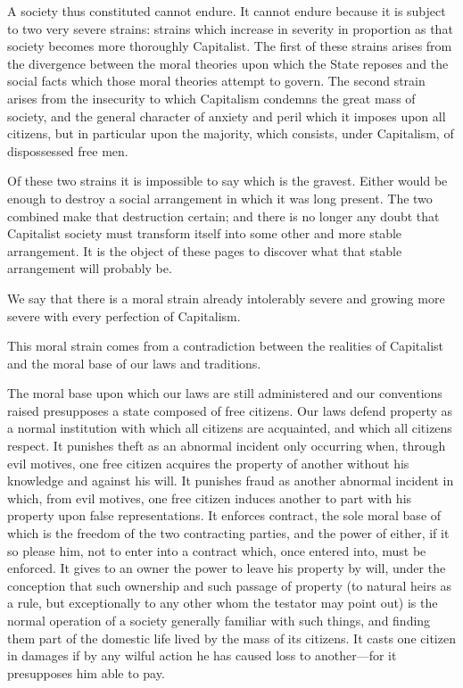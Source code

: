 \documentclass{book}
\begin{document}
A society thus constituted cannot endure. It cannot endure because it is subject to two very severe strains: strains which increase in severity in proportion as that society becomes more thoroughly Capitalist. The first of these strains arises from the divergence between the moral theories upon which the State reposes and the social facts which those moral theories attempt to govern. The second strain arises from the insecurity to which Capitalism condemns the great mass of society, and the general character of anxiety and peril which it imposes upon all citizens, but in particular upon the majority, which consists, under Capitalism, of dispossessed free men.

Of these two strains it is impossible to say which is the gravest. Either would be enough to destroy a social arrangement in which it was long present. The two combined make that destruction certain; and there is no longer any doubt that Capitalist society must transform itself into some other and more stable arrangement. It is the object of these pages to discover what that stable arrangement will probably be.

We say that there is a moral strain already intolerably severe and growing more severe with every perfection of Capitalism.

This moral strain comes from a contradiction between the realities of Capitalist and the moral base of our laws and traditions.

The moral base upon which our laws are still administered and our conventions raised presupposes a state composed of free citizens. Our laws defend property as a normal institution with which all citizens are acquainted, and which all citizens respect. It punishes theft as an abnormal incident only occurring when, through evil motives, one free citizen acquires the property of another without his knowledge and against his will. It punishes fraud as another abnormal incident in which, from evil motives, one free citizen induces another to part with his property upon false representations. It enforces contract, the sole moral base of which is the freedom of the two contracting parties, and the power of either, if it so please him, not to enter into a contract which, once entered into, must be enforced. It gives to an owner the power to leave his property by will, under the conception that such ownership and such passage of property (to natural heirs as a rule, but exceptionally to any other whom the testator may point out) is the normal operation of a society generally familiar with such things, and finding them part of the domestic life lived by the mass of its citizens. It casts one citizen in damages if by any wilful action he has caused loss to another—for it presupposes him able to pay.
\end{document}
